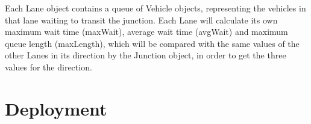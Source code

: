\documentclass{article}
\begin{document}
Each Lane object contains a queue of Vehicle objects, representing the vehicles in that lane waiting to transit the junction. Each Lane 
will calculate its own maximum wait time (maxWait), average wait time (avgWait) and maximum queue length (maxLength), which will be 
compared with the same values of the other Lanes in its direction by the Junction object, in order to get the three values for the direction.

\section{Deployment}
\end{document}
